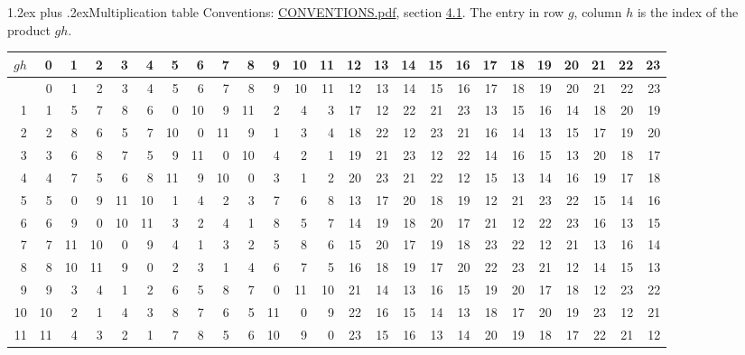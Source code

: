 \documentclass[10pt,a4paper]{article}
\makeatletter
\renewcommand\section{\@startsection{section}{1}{\z@}{-3ex plus -1ex minus -.2ex}%
  {1.2ex plus .2ex}{\normalfont\large\sffamily\bfseries\color{parttitle}}}
\numberwithin{equation}{section}
\makeatother
\begin{document}
\section{Multiplication table}\label{s:multiplication}
Conventions: \href{../../CONVENTIONS.pdf}{CONVENTIONS.pdf}, section \href{../../CONVENTIONS.pdf\#conv.4.1}{4.1}.
The entry in row $g$, column $h$ is the index of the product $gh$.
{\normalsize\setlength{\tabcolsep}{0.1em}\setlength{\LTleft}{-8pt plus 1fill}\setlength{\LTright}{-8pt plus 1fill}\begin{longtable}{@{}r|rrrrrrrrrrrrrrrrrrrrrrrr@{}}\toprule
$gh$ & 0 & 1 & 2 & 3 & 4 & 5 & 6 & 7 & 8 & 9 & 10 & 11 & 12 & 13 & 14 & 15 & 16 & 17 & 18 & 19 & 20 & 21 & 22 & 23\\\midrule\endhead
\bottomrule\endfoot\endlastfoot
0 & 0 & 1 & 2 & 3 & 4 & 5 & 6 & 7 & 8 & 9 & 10 & 11 & 12 & 13 & 14 & 15 & 16 & 17 & 18 & 19 & 20 & 21 & 22 & 23\\*
1 & 1 & 5 & 7 & 8 & 6 & 0 & 10 & 9 & 11 & 2 & 4 & 3 & 17 & 12 & 22 & 21 & 23 & 13 & 15 & 16 & 14 & 18 & 20 & 19\\
2 & 2 & 8 & 6 & 5 & 7 & 10 & 0 & 11 & 9 & 1 & 3 & 4 & 18 & 22 & 12 & 23 & 21 & 16 & 14 & 13 & 15 & 17 & 19 & 20\\
3 & 3 & 6 & 8 & 7 & 5 & 9 & 11 & 0 & 10 & 4 & 2 & 1 & 19 & 21 & 23 & 12 & 22 & 14 & 16 & 15 & 13 & 20 & 18 & 17\\
4 & 4 & 7 & 5 & 6 & 8 & 11 & 9 & 10 & 0 & 3 & 1 & 2 & 20 & 23 & 21 & 22 & 12 & 15 & 13 & 14 & 16 & 19 & 17 & 18\\
5 & 5 & 0 & 9 & 11 & 10 & 1 & 4 & 2 & 3 & 7 & 6 & 8 & 13 & 17 & 20 & 18 & 19 & 12 & 21 & 23 & 22 & 15 & 14 & 16\\
6 & 6 & 9 & 0 & 10 & 11 & 3 & 2 & 4 & 1 & 8 & 5 & 7 & 14 & 19 & 18 & 20 & 17 & 21 & 12 & 22 & 23 & 16 & 13 & 15\\
7 & 7 & 11 & 10 & 0 & 9 & 4 & 1 & 3 & 2 & 5 & 8 & 6 & 15 & 20 & 17 & 19 & 18 & 23 & 22 & 12 & 21 & 13 & 16 & 14\\
8 & 8 & 10 & 11 & 9 & 0 & 2 & 3 & 1 & 4 & 6 & 7 & 5 & 16 & 18 & 19 & 17 & 20 & 22 & 23 & 21 & 12 & 14 & 15 & 13\\
9 & 9 & 3 & 4 & 1 & 2 & 6 & 5 & 8 & 7 & 0 & 11 & 10 & 21 & 14 & 13 & 16 & 15 & 19 & 20 & 17 & 18 & 12 & 23 & 22\\
10 & 10 & 2 & 1 & 4 & 3 & 8 & 7 & 6 & 5 & 11 & 0 & 9 & 22 & 16 & 15 & 14 & 13 & 18 & 17 & 20 & 19 & 23 & 12 & 21\\
11 & 11 & 4 & 3 & 2 & 1 & 7 & 8 & 5 & 6 & 10 & 9 & 0 & 23 & 15 & 16 & 13 & 14 & 20 & 19 & 18 & 17 & 22 & 21 & 12\\

\end{longtable}}
\end{document}
